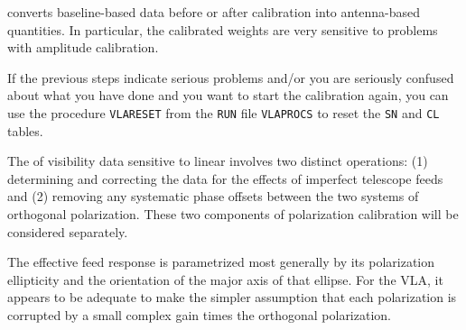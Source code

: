 {\tt {}} converts baseline-based data before or after
calibration into antenna-based quantities.  In particular, the
calibrated weights are very sensitive to problems with amplitude
calibration.

     If the previous steps indicate serious problems and/or you are
seriously confused about what you have done and you want to start the
calibration again, you can use the procedure {\tt VLARESET} from the
{\tt RUN} file {\tt VLAPROCS} to reset the {\tt SN} and {\tt CL} tables.


     The  of visibility data sensitive to linear
 involves two distinct operations: (1) determining
and correcting the data for the effects of imperfect telescope feeds
and (2) removing any systematic phase offsets between the two systems
of orthogonal polarization.  These two components of polarization
calibration will be considered separately.

     The effective feed response is parametrized most generally by
its polarization ellipticity and the orientation of the major axis of
that ellipse.  For the VLA, it appears to be adequate to make the
simpler assumption that each polarization is corrupted by a small
complex gain times the orthogonal polarization.

